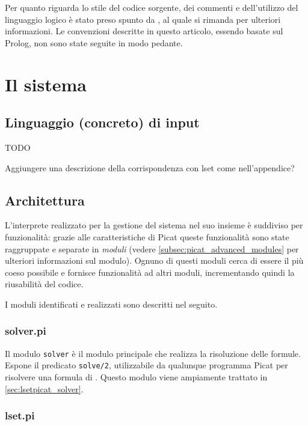 \documentclass[12pt,a4paper,openright]{book} %
\begin{document}
Per quanto riguarda lo stile del codice sorgente, dei commenti e
dell'utilizzo del linguaggio logico è stato preso spunto da
\cite{Covington12}, al quale si rimanda per ulteriori informazioni. Le
convenzioni descritte in questo articolo, essendo basate sul Prolog,
non sono state seguite in modo pedante.

\section{Il sistema}
\label{sec:lsetpicat_system}

\subsection{Linguaggio (concreto) di input}

TODO

Aggiungere una descrizione della corrispondenza con lset come
nell'appendice?

\subsection{Architettura}
\label{subsec:lsetpicat_architecture}

L'interprete realizzato per la gestione del sistema nel suo insieme è
suddiviso per funzionalità: grazie alle caratteristiche di Picat
queste funzionalità sono state raggruppate e separate in \emph{moduli}
(vedere \ref{subsec:picat_advanced_modules} per ulteriori informazioni
sul modulo). Ognuno di questi moduli cerca di essere il più coeso
possibile e fornisce funzionalità ad altri moduli, incrementando
quindi la riusabilità del codice.

I moduli identificati e realizzati sono descritti nel seguito.

\subsubsection{solver.pi}

Il modulo \texttt{solver} è il modulo principale che realizza la
risoluzione delle formule. Espone il predicato \verb|solve/2|,
utilizzabile da qualunque programma Picat per risolvere una formula di
\lset{}. Questo modulo viene ampiamente trattato in
\ref{sec:lsetpicat_solver}.

\subsubsection{lset.pi}
\end{document}
